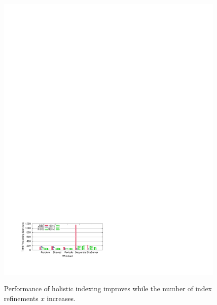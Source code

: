 \begin{figure}[!htb]
\begin{center}
\includegraphics[trim=1.8cm 2cm 0cm 22.5cm]{Figures/holistic/cracks_number}
\vspace{-0.2 in}
\caption{Performance of holistic indexing improves while the number of index refinements $x$ increases.}
\vspace{-0.7 cm}
\label{fig:cracks_number}
\end{center}
\end{figure}



